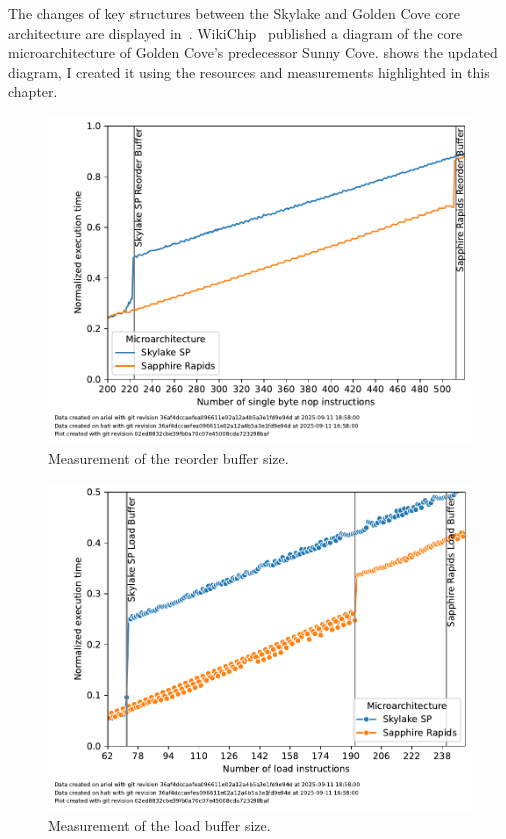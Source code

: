 The changes of key structures between the Skylake and Golden Cove core architecture are displayed in~.
WikiChip~\cite{Wikichip_SunnyCoveDiagram} published a diagram of the core microarchitecture of Golden Cove's predecessor Sunny Cove.
 shows the updated diagram, I created it using the resources and measurements highlighted in this chapter.

\begin{figure}[]
    \centering
    \includegraphics[width=0.8\columnwidth]{fig/robsize/reorder-buffer.pdf}
    \caption{\label{fig:robsize-reorder}Measurement of the reorder buffer size.}
\end{figure}
\begin{figure}[]
    \centering
    \includegraphics[width=0.8\columnwidth]{fig/robsize/load-buffer.pdf}
    \caption{\label{fig:robsize-load}Measurement of the load buffer size.}
\end{figure}
